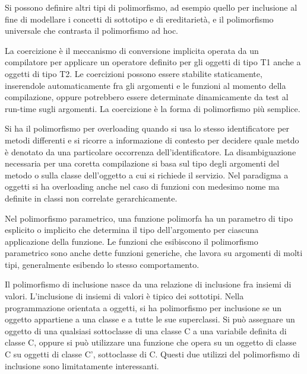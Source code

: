 \documentclass[a4paper,18pt]{extarticle}
\begin{document}
Si possono definire altri tipi di polimorfismo, ad esempio quello per inclusione al fine di modellare i concetti di sottotipo e di ereditarietà, e il polimorfismo universale che contrasta il polimorfismo ad hoc.

La coercizione è il meccanismo di conversione implicita operata da un compilatore per applicare un operatore definito per gli oggetti di tipo T1 anche a oggetti di tipo T2. Le coercizioni possono essere stabilite staticamente, inserendole automaticamente fra gli argomenti e le funzioni al momento della compilazione, oppure potrebbero essere determinate dinamicamente da test al run-time sugli argomenti. La coercizione è la forma di polimorfismo più semplice.

Si ha il polimorfismo per overloading quando si usa lo stesso identificatore per metodi differenti e si ricorre a informazione di contesto per decidere quale metdo è denotato da una particolare occorrenza dell'identificatore. La disambiguazione necessaria per una coretta compilazione si basa sul tipo degli argomenti del metodo o sulla classe dell'oggetto a cui si richiede il servizio. Nel paradigma a oggetti si ha overloading anche nel caso di funzioni con medesimo nome ma definite in classi non correlate gerarchicamente.

Nel polimorfismo parametrico, una funzione polimorfa ha un parametro di tipo esplicito o implicito che determina il tipo dell'argomento per ciascuna applicazione della funzione. Le funzioni che esibiscono il polimorfismo parametrico sono anche dette funzioni generiche, che lavora su argomenti di molti tipi, generalmente esibendo lo stesso comportamento.

Il polimorfismo di inclusione nasce da una relazione di inclusione fra insiemi di valori. L'inclusione di insiemi di valori è tipico dei sottotipi. Nella programmazione orientata a oggetti, si ha polimorfismo per inclusione se un oggetto appartiene a una classe e a tutte le sue superclassi. Si può assegnare un oggetto di una qualsiasi sottoclasse di una classe C a una variabile definita di classe C, oppure si può utilizzare una funzione che opera su un oggetto di classe C su oggetti di classe C', sottoclasse di C. Questi due utilizzi del polimorfismo di inclusione sono limitatamente interessanti.
\end{document}

